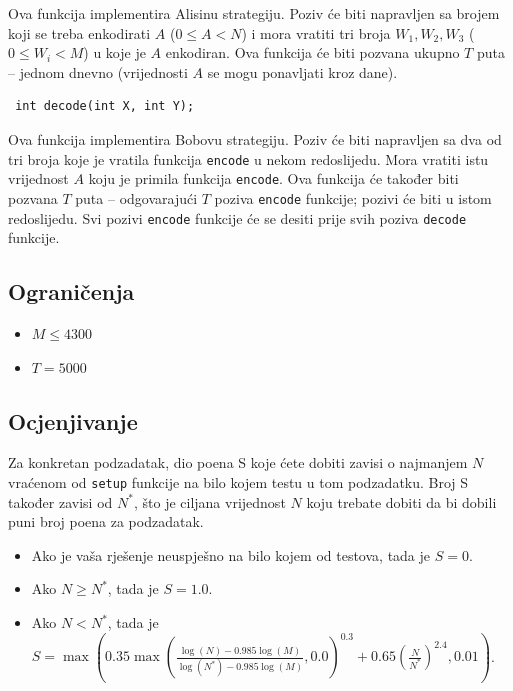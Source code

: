 \documentclass[12pt]{article}
\begin{document}
Ova funkcija implementira Alisinu strategiju. Poziv će biti napravljen sa brojem koji se treba enkodirati $A$ ($0 \leq A < N$) i mora vratiti tri broja $W_1, W_2, W_3$ ($0 \leq W_i < M$) u koje je $A$ enkodiran. Ova funkcija će biti pozvana ukupno $T$ puta -- jednom dnevno (vrijednosti $A$ se mogu ponavljati kroz dane).

\begin{lstlisting}
 int decode(int X, int Y);
\end{lstlisting}

Ova funkcija implementira Bobovu strategiju. Poziv će biti napravljen sa dva od tri broja koje je vratila funkcija \texttt{encode} u nekom redoslijedu. Mora vratiti istu vrijednost $A$ koju je primila funkcija \texttt{encode}. Ova funkcija će također biti pozvana $T$ puta -- odgovarajući $T$ poziva \texttt{encode} funkcije; pozivi će biti u istom redoslijedu. Svi pozivi \texttt{encode} funkcije će se desiti prije svih poziva \texttt{decode} funkcije.

\subsection{Ograničenja}

\begin{itemize}
\item $M \leq 4300$
\item $T = 5000$
\end{itemize}

\subsection{Ocjenjivanje}

Za konkretan podzadatak, dio poena S koje ćete dobiti zavisi o najmanjem $N$ vraćenom od \texttt{setup} funkcije na bilo kojem testu u tom podzadatku. Broj S također zavisi od $N^*$, što je ciljana vrijednost $N$ koju trebate dobiti da bi dobili puni broj poena za podzadatak.

\begin{itemize}
\item Ako je vaša rješenje neuspješno na bilo kojem od testova, tada je  $S = 0$.
\item Ako $N \geq N^*$, tada je $S = 1.0$.
\item Ako $N < N^*$, tada je $S = \max\left(0.35 \max\left(\frac{\log(N) - 0.985 \log(M)}{\log(N^*) - 0.985 \log(M)}, 0.0\right)^{0.3} + 0.65 \left(\frac{N}{N^*}\right)^{2.4}, 0.01\right)$.
\end{itemize}
\end{document}
